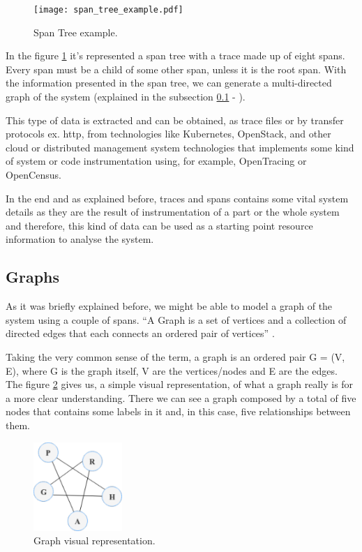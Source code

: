 \begin{figure}[H]
    \centering
    \texttt{[image: span\_tree\_example.pdf]}
    \caption{Span Tree example.}
    \label{fig:span_tree_example}
\end{figure}

In the figure \ref{fig:span_tree_example} it's represented a span tree with a trace made up of eight spans. Every span must be a child of some other span, unless it is the root span. With the information presented in the span tree, we can generate a multi-directed graph of the system (explained in the subsection \ref{subsec:graphs} - ).

This type of data is extracted and can be obtained, as trace files or by transfer protocols ex. \gls{http}, from technologies like Kubernetes\cite{what_is_kubernetes}, OpenStack\cite{what_is_opensatck}, and other cloud or distributed management system technologies that implements some kind of system or code instrumentation using, for example, OpenTracing\cite{what_is_opentracing} or OpenCensus\cite{what_is_opencensus}.

In the end and as explained before, traces and spans contains some vital system details as they are the result of instrumentation of a part or the whole system and therefore, this kind of data can be used as a starting point resource information to analyse the system.

\subsection{Graphs}
\label{subsec:graphs}

As it was briefly explained  before, we might be able to model a graph of the system using a couple of spans. ``A Graph is a set of vertices and a collection of directed edges that each connects an ordered pair of vertices'' \cite{graph_standard_definition}.

Taking the very common sense of the term, a graph is an ordered pair G = (V, E), where G is the graph itself, V are the vertices/nodes and E are the edges. The figure \ref{fig:graph_visual_representation} gives us, a simple visual representation, of what a graph really is for a more clear understanding. There we can see a graph composed by a total of five nodes that contains some labels in it and, in this case, five relationships between them.

\begin{figure}[H]
    \centering
    \includegraphics[width=0.30\textwidth]{images/graph_visual_representation.pdf}
    \caption{Graph visual representation.}
    \label{fig:graph_visual_representation}
\end{figure}

